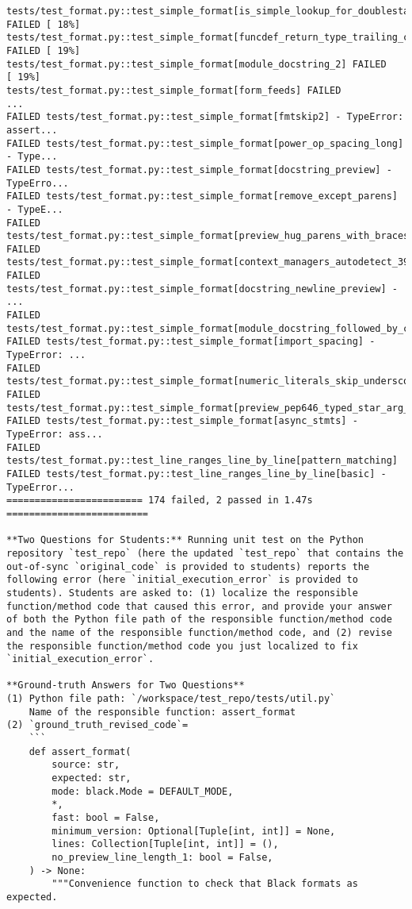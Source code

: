 \begin{Verbatim}[fontsize=\small, breaklines=true, breakanywhere=true]
tests/test_format.py::test_simple_format[is_simple_lookup_for_doublestar_expression] FAILED [ 18%]
tests/test_format.py::test_simple_format[funcdef_return_type_trailing_comma] FAILED [ 19%]
tests/test_format.py::test_simple_format[module_docstring_2] FAILED      [ 19%]
tests/test_format.py::test_simple_format[form_feeds] FAILED
...
FAILED tests/test_format.py::test_simple_format[fmtskip2] - TypeError: assert...
FAILED tests/test_format.py::test_simple_format[power_op_spacing_long] - Type...
FAILED tests/test_format.py::test_simple_format[docstring_preview] - TypeErro...
FAILED tests/test_format.py::test_simple_format[remove_except_parens] - TypeE...
FAILED tests/test_format.py::test_simple_format[preview_hug_parens_with_braces_and_square_brackets]
FAILED tests/test_format.py::test_simple_format[context_managers_autodetect_39]
FAILED tests/test_format.py::test_simple_format[docstring_newline_preview] - ...
FAILED tests/test_format.py::test_simple_format[module_docstring_followed_by_class]
FAILED tests/test_format.py::test_simple_format[import_spacing] - TypeError: ...
FAILED tests/test_format.py::test_simple_format[numeric_literals_skip_underscores]
FAILED tests/test_format.py::test_simple_format[preview_pep646_typed_star_arg_type_var_tuple]
FAILED tests/test_format.py::test_simple_format[async_stmts] - TypeError: ass...
FAILED tests/test_format.py::test_line_ranges_line_by_line[pattern_matching]
FAILED tests/test_format.py::test_line_ranges_line_by_line[basic] - TypeError...
======================== 174 failed, 2 passed in 1.47s =========================

**Two Questions for Students:** Running unit test on the Python repository `test_repo` (here the updated `test_repo` that contains the out-of-sync `original_code` is provided to students) reports the following error (here `initial_execution_error` is provided to students). Students are asked to: (1) localize the responsible function/method code that caused this error, and provide your answer of both the Python file path of the responsible function/method code and the name of the responsible function/method code, and (2) revise the responsible function/method code you just localized to fix `initial_execution_error`.

**Ground-truth Answers for Two Questions**
(1) Python file path: `/workspace/test_repo/tests/util.py`
    Name of the responsible function: assert_format
(2) `ground_truth_revised_code`=
    ```
    def assert_format(
        source: str,
        expected: str,
        mode: black.Mode = DEFAULT_MODE,
        *,
        fast: bool = False,
        minimum_version: Optional[Tuple[int, int]] = None,
        lines: Collection[Tuple[int, int]] = (),
        no_preview_line_length_1: bool = False,
    ) -> None:
        """Convenience function to check that Black formats as expected.


\end{Verbatim}
